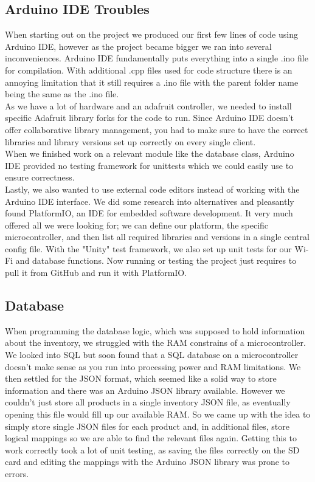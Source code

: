 \documentclass{article}
\begin{document}
\subsection{Arduino IDE Troubles}
When starting out on the project we produced our first few lines of code using Arduino IDE, however as the project became bigger we ran into several inconveniences.
Arduino IDE fundamentally puts everything into a single .ino file for compilation. With additional .cpp files used for code structure there is an annoying limitation that it still requires a .ino file with the parent folder name being the same as the .ino file. \\
As we have a lot of hardware and an adafruit controller, we needed to install specific Adafruit library forks for the code to run. 
Since Arduino IDE doesn't offer collaborative library management, you had to make sure to have the correct libraries and library versions set up correctly on every single client. \\
When we finished work on a relevant module like the database class, Arduino IDE provided no testing framework for unittests which we could easily use to ensure correctness. \\
Lastly, we also wanted to use external code editors instead of working with the Arduino IDE interface.
We did some research into alternatives and pleasantly found PlatformIO, an IDE for embedded software development.
It very much offered all we were looking for; we can define our platform, the specific microcontroller, and then list all required libraries and versions in a single central config file.
With the "Unity" test framework, we also set up unit tests for our Wi-Fi and database functions.
Now running or testing the project just requires to pull it from GitHub and run it with PlatformIO.
\subsection{Database}
When programming the database logic, which was supposed to hold information about the inventory, we struggled with the RAM constrains of a microcontroller.
We looked into SQL but soon found that a SQL database on a microcontroller doesn't make sense as you run into processing power and RAM limitations.
We then settled for the JSON format, which seemed like a solid way to store information and there was an Arduino JSON library available.
However we couldn't just store all products in a single inventory JSON file, as eventually opening this file would fill up our available RAM.
So we came up with the idea to simply store single JSON files for each product and, in additional files, store logical mappings so we are able to find the relevant files again.
Getting this to work correctly took a lot of unit testing, as saving the files correctly on the SD card and editing the mappings with the Arduino JSON library was prone to errors.
\end{document}
